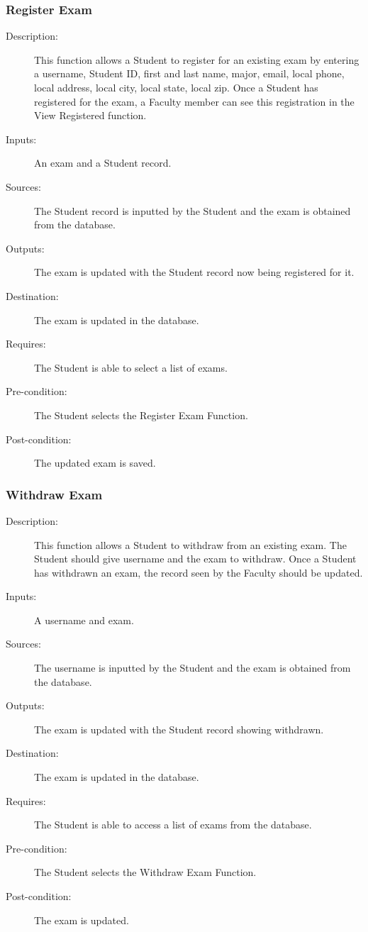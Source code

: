 \subsubsection{\large Register Exam} 
\begin{boxed} %
\begin{description}
\item[Description:]
   This function allows a Student to register for an existing exam by entering a
   username, Student ID, first and last name, major, email, local phone, local
   address, local city, local state, local zip.  Once a Student has registered
   for the exam, a Faculty member can see this registration in the View
   Registered function.
\item[Inputs:]
   An exam and a Student record.
\item[Sources:]
   The Student record is inputted by the Student and the exam is
   obtained from the database.
\item[Outputs:]
   The exam is updated with the Student record now being registered for
   it.
\item[Destination:]
   The exam is updated in the database.
\item[Requires:]
   The Student is able to select a list of exams.
\item[Pre-condition:]
   The Student selects the Register Exam Function.
\item[Post-condition:]
   The updated exam is saved.
\end{description}
\end{boxed} %

\subsubsection{\large Withdraw Exam} 
\begin{boxed} %
\begin{description}
\item[Description:]
   This function allows a Student to withdraw from an existing exam. The Student
   should give username and the exam to withdraw. Once a Student has withdrawn
   an exam, the record seen by the Faculty should be updated.
\item[Inputs:]
   A username and exam.
\item[Sources:]
   The username is inputted by the Student and the exam is obtained from
   the database.
\item[Outputs:]
   The exam is updated with the Student record showing withdrawn.
\item[Destination:]
   The exam is updated in the database.
\item[Requires:]
   The Student is able to access a list of exams from the database.
\item[Pre-condition:]
   The Student selects the Withdraw Exam Function.
\item[Post-condition:]
   The exam is updated.
\end{description}
\end{boxed} %

